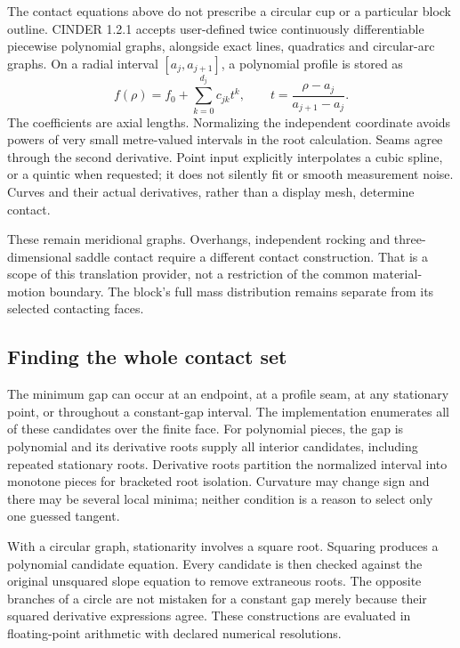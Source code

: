 \documentclass[11pt,letterpaper]{article}
\numberwithin{equation}{section}
\begin{document}
The contact equations above do not prescribe a circular cup or a particular
block outline. CINDER 1.2.1 accepts user-defined twice continuously
differentiable piecewise polynomial graphs, alongside exact lines, quadratics
and circular-arc graphs. On a radial interval $[a_j,a_{j+1}]$, a polynomial
profile is stored as
\begin{equation}
 f(\rho)=f_0+\sum_{k=0}^{d_j}c_{jk}t^k,
 \qquad t=\frac{\rho-a_j}{a_{j+1}-a_j}.
 \label{eq:profile-polynomial}
\end{equation}
The coefficients are axial lengths. Normalizing the independent coordinate
avoids powers of very small metre-valued intervals in the root calculation.
Seams agree through the second derivative. Point input explicitly interpolates
a cubic spline, or a quintic when requested; it does not silently fit or smooth
measurement noise. Curves and their actual derivatives, rather than a display
mesh, determine contact.

These remain meridional graphs. Overhangs, independent rocking and
three-dimensional saddle contact require a different contact construction.
That is a scope of this translation provider, not a restriction of the common
material-motion boundary. The block's full mass distribution remains separate
from its selected contacting faces.

\subsection{Finding the whole contact set}

The minimum gap can occur at an endpoint, at a profile seam, at any stationary
point, or throughout a constant-gap interval. The implementation enumerates
all of these candidates over the finite face. For polynomial pieces, the gap
is polynomial and its derivative roots supply all interior candidates,
including repeated stationary roots. Derivative roots partition the normalized
interval into monotone pieces for bracketed root isolation. Curvature may
change sign and there may be several local minima; neither condition is a
reason to select only one guessed tangent.

With a circular graph, stationarity involves a square root. Squaring produces
a polynomial candidate equation. Every candidate is then checked against the
original unsquared slope equation to remove extraneous roots. The opposite
branches of a circle are not mistaken for a constant gap merely because their
squared derivative expressions agree. These constructions are evaluated in
floating-point arithmetic with declared numerical resolutions.
\end{document}
